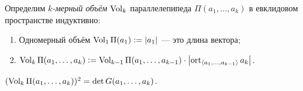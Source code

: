 \begin{definition}
    Определим \textit{$k$-мерный объём} $\operatorname{Vol}_k$ параллелепипеда $\Pi(a_1, \ldots, a_k)$ в евклидовом пространстве индуктивно:
    \begin{enumerate}[nolistsep]
        \item Одномерный объём $\operatorname{Vol}_1\Pi(a_1) \vcentcolon = \left\lvert a_1\right\rvert$ --- это длина вектора;
        \item $\operatorname{Vol}_k\Pi(a_1, \ldots, a_k) \vcentcolon = \operatorname{Vol}_{k - 1}\Pi(a_1, \ldots, a_{k - 1}) \cdot \left\lvert\operatorname{ort}_{\langle a_1, \ldots, a_{k - 1}\rangle}a_k\right\rvert$.
    \end{enumerate}
\end{definition}

\begin{theorem}
    $(\operatorname{Vol}_k\Pi(a_1, \ldots, a_k))^2 = \det G(a_1, \ldots, a_k)$.
\end{theorem}

